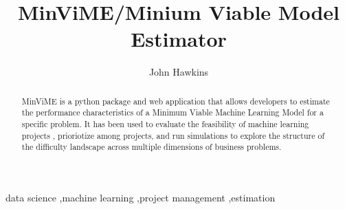 \documentclass[preprint,12pt, a4paper]{elsarticle}
\begin{document}
\begin{frontmatter}



\title{MinViME/Minium Viable Model Estimator}


\author{John Hawkins}

\address{}

\begin{abstract}
MinViME is a python package and web application that allows developers
to estimate the performance characteristics of a Minimum Viable Machine Learning Model for a specific
problem. It has been used to evaluate the feasibility of machine learning projects
, prioriotize among projects, and run simulations to explore the
structure of the difficulty landscape across multiple dimensions
of business problems.

\end{abstract}

\begin{keyword}
data science \sep machine learning \sep project management \sep estimation



\end{keyword}

\end{frontmatter}

\end{document}
